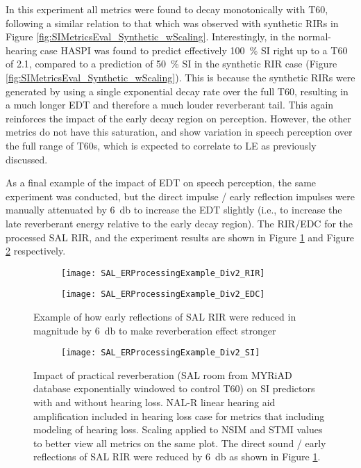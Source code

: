 In this experiment all metrics were found to decay monotonically with T60, following a similar relation to that which was observed with synthetic RIRs in Figure \ref{fig:SIMetricsEval_Synthetic_wScaling}. Interestingly, in the normal-hearing case HASPI was found to predict effectively \qty{100}{\percent} SI right up to a T60 of \qty{2.1}{\sec}, compared to a prediction of \qty{50}{\percent} SI in the synthetic RIR case (Figure \ref{fig:SIMetricsEval_Synthetic_wScaling}). This is because the synthetic RIRs were generated by using a single exponential decay rate over the full T60, resulting in a much longer EDT and therefore a much louder reverberant tail. This again reinforces the impact of the early decay region on perception. However, the other metrics do not have this saturation, and show variation in speech perception over the full range of T60s, which is expected to correlate to LE as previously discussed.

As a final example of the impact of EDT on speech perception, the same experiment was conducted, but the direct impulse / early reflection impulses were manually attenuated by \qty{6}{\decibel} to increase the EDT slightly (i.e., to increase the late reverberant energy relative to the early decay region). The RIR/EDC for the processed SAL RIR, and the experiment results are shown in Figure \ref{fig:SAL_ERProcessing_Div2} and Figure \ref{fig:SAL_ERProcessing_Div2_SI_Results} respectively.


\begin{figure}[H]
	\centering
	\begin{subfigure}[b]{0.49\textwidth}
		\centering
		\texttt{[image: SAL\_ERProcessingExample\_Div2\_RIR]}
	\end{subfigure}
	\hfill
	\begin{subfigure}[b]{0.49\textwidth}
		\centering
		\texttt{[image: SAL\_ERProcessingExample\_Div2\_EDC]}
	\end{subfigure}
	\caption[Example of reducing prominance of early reflections]{Example of how early reflections of SAL RIR were reduced in magnitude by \qty{6}{\decibel} to make reverberation effect stronger}
	\label{fig:SAL_ERProcessing_Div2}
\end{figure}

\begin{figure}[H]
	\centering
	\begin{subfigure}[b]{0.98\textwidth}
		\centering
		\texttt{[image: SAL\_ERProcessingExample\_Div2\_SI]}
	\end{subfigure}
	\caption[Impact of exponentially windowed real RIRs with reduced early reflections on proposed SI predictors (after scaling)]{Impact of practical reverberation (SAL room from MYRiAD database exponentially windowed to control T60) on SI predictors with and without hearing loss. NAL-R linear hearing aid amplification included in hearing loss case for metrics that including modeling of hearing loss.  Scaling applied to NSIM and STMI values to better view all metrics on the same plot. The direct sound / early reflections of SAL RIR were reduced by \qty{6}{\decibel} as shown in Figure \ref{fig:SAL_ERProcessing_Div2}.}
	\label{fig:SAL_ERProcessing_Div2_SI_Results}
\end{figure}

